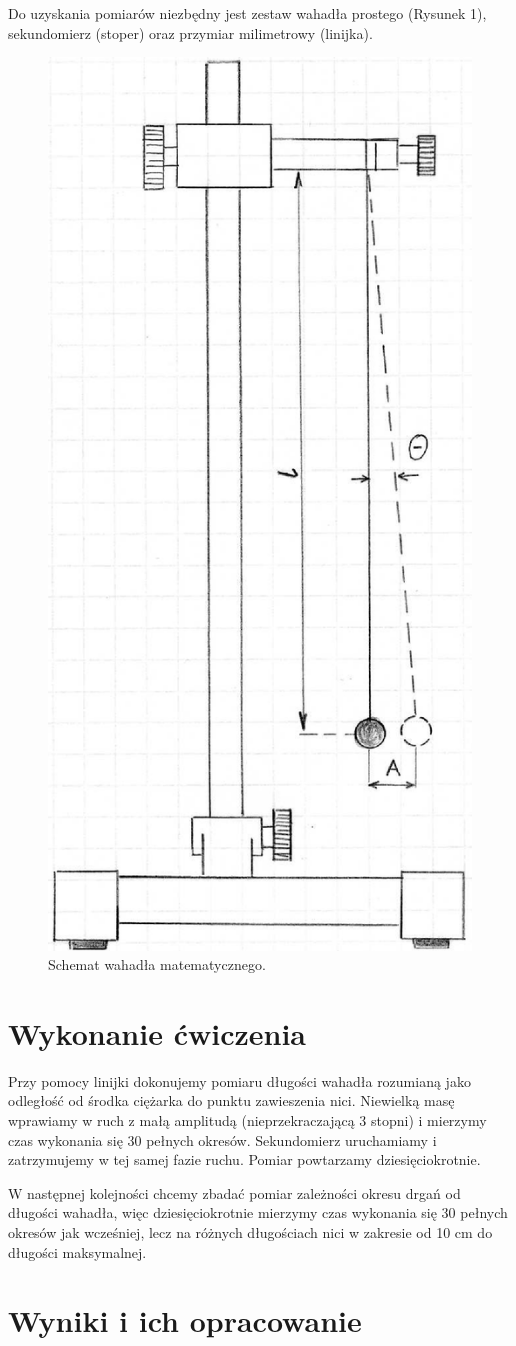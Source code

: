 \documentclass[a4paper,11pt]{article}
\begin{document}
Do uzyskania pomiarów niezbędny jest zestaw wahadła prostego (Rysunek 1), sekundomierz (stoper) oraz przymiar milimetrowy (linijka). 

\begin{figure}[ht]
\centering
\includegraphics[width=0.3\linewidth]{./wahadlo}
\caption{Schemat wahadła matematycznego.}
\end{figure}

\section{Wykonanie ćwiczenia}

Przy pomocy linijki dokonujemy pomiaru długości wahadła rozumianą jako odległość od środka ciężarka do punktu zawieszenia nici. Niewielką masę wprawiamy w ruch z małą amplitudą (nieprzekraczającą 3 stopni) i mierzymy czas wykonania się 30 pełnych okresów. Sekundomierz uruchamiamy i zatrzymujemy w tej samej fazie ruchu. Pomiar powtarzamy dziesięciokrotnie.

W następnej kolejności chcemy zbadać pomiar zależności okresu drgań od długości wahadła, więc dziesięciokrotnie mierzymy czas wykonania się 30 pełnych okresów jak wcześniej, lecz na różnych długościach nici w zakresie od 10 cm do długości maksymalnej.
  
\section{Wyniki i ich opracowanie}
\end{document}
